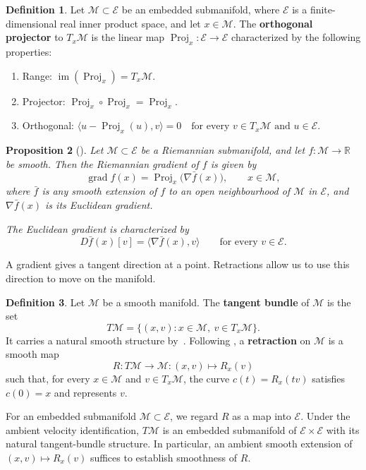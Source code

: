 \documentclass[12pt]{article}
\theoremstyle{definition}
\newtheorem{definition}{Definition}[section]
\theoremstyle{plain}
\newtheorem{proposition}[definition]{Proposition}
\theoremstyle{remark}
\DeclareMathOperator{\grad}{grad}            %
\DeclareMathOperator{\Proj}{Proj}            %
\DeclareMathOperator{\im}{im}                %
\begin{document}
\begin{definition}\label{def:orthogonal-projector}
  Let \( \mathcal{M} \subset \mathcal{E} \) be an embedded submanifold, where \( \mathcal{E} \) is a finite-dimensional real inner product space, and let \( x \in \mathcal{M} \).
  The \textbf{orthogonal projector} to \( T_x\mathcal{M} \) is the linear map \( \Proj_x : \mathcal{E} \rightarrow \mathcal{E} \) characterized by the following properties:
  \begin{enumerate}
    \item Range: \( \im(\Proj_x) = T_x\mathcal{M} \).
    \item Projector: \( \Proj_x \circ \Proj_x = \Proj_x \).
    \item Orthogonal: \( \langle u - \Proj_x(u), v \rangle = 0 \quad \text{for every } v \in T_x\mathcal{M} \text{ and } u \in \mathcal{E} \).
  \end{enumerate}
\end{definition}


\begin{proposition}[{\cite[Proposition 3.61]{boumal}}]\label{prop:gradient-projection}
  Let \( \mathcal{M} \subset \mathcal{E} \) be a Riemannian submanifold, and let \( f : \mathcal{M} \rightarrow \mathbb{R} \) be smooth.
  Then the Riemannian gradient of \( f \) is given by
  \[
    \grad f(x) = \Proj_x\bigl(\nabla \bar{f}(x)\bigr), \qquad x \in \mathcal{M},
  \]
  where \( \bar{f} \) is any smooth extension of \( f \) to an open neighbourhood of \( \mathcal{M} \) in \( \mathcal{E} \), and \( \nabla \bar{f}(x) \) is its Euclidean gradient.

  The Euclidean gradient is characterized by
  \[
    D\bar{f}(x)[v] = \langle \nabla \bar{f}(x), v \rangle \qquad \text{for every } v \in \mathcal{E}.
  \]
\end{proposition}

A gradient gives a tangent direction at a point.
Retractions allow us to use this direction to move on the manifold.

\begin{definition}\label{def:retraction}
  Let \( \mathcal{M} \) be a smooth manifold.
  The \textbf{tangent bundle} of \( \mathcal{M} \) is the set
  \[
    T\mathcal{M} = \{(x, v) : x \in \mathcal{M},\ v \in T_x\mathcal{M}\}.
  \]
  It carries a natural smooth structure by~\cite[Proposition E.1]{segal}. Following \cite[Definition 3.47]{boumal}, a \textbf{retraction} on \( \mathcal{M} \) is a smooth map
  \[
    R : T\mathcal{M} \rightarrow \mathcal{M} : (x, v) \mapsto R_x(v)
  \]
  such that, for every \( x \in \mathcal{M} \) and \( v \in T_x\mathcal{M} \), the curve \( c(t) = R_x(tv) \) satisfies \( c(0) = x \) and represents \( v \).

  For an embedded submanifold \( \mathcal{M} \subset \mathcal{E} \), we regard \( R \) as a map into \( \mathcal{E} \).
  Under the ambient velocity identification, \( T\mathcal{M} \) is an embedded submanifold of \( \mathcal{E}\times\mathcal{E} \) with its natural tangent-bundle structure.
  In particular, an ambient smooth extension of \( (x,v)\mapsto R_x(v) \) suffices to establish smoothness of \( R \).

\end{definition}
\end{document}
